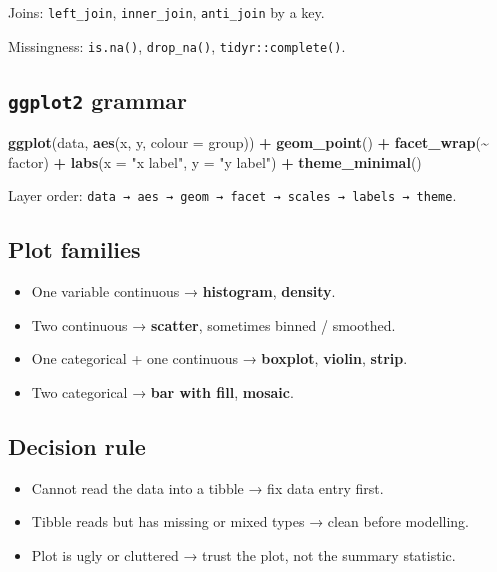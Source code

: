 \documentclass[
]{article}
\newenvironment{Shaded}{\begin{snugshade}}{\end{snugshade}}
\newcommand{\AttributeTok}[1]{\textcolor[rgb]{0.13,0.29,0.53}{#1}}
\newcommand{\FunctionTok}[1]{\textcolor[rgb]{0.13,0.29,0.53}{\textbf{#1}}}
\newcommand{\NormalTok}[1]{#1}
\newcommand{\SpecialCharTok}[1]{\textcolor[rgb]{0.81,0.36,0.00}{\textbf{#1}}}
\newcommand{\StringTok}[1]{\textcolor[rgb]{0.31,0.60,0.02}{#1}}
\providecommand{\tightlist}{%
  \setlength{\itemsep}{0pt}\setlength{\parskip}{0pt}}
\begin{document}
Joins: \texttt{left\_join}, \texttt{inner\_join}, \texttt{anti\_join} by
a key.

Missingness: \texttt{is.na()}, \texttt{drop\_na()},
\texttt{tidyr::complete()}.

\subsection{\texorpdfstring{\texttt{ggplot2}
grammar}{ggplot2 grammar}}\label{ggplot2-grammar}

\begin{Shaded}
\begin{Highlighting}[]
\FunctionTok{ggplot}\NormalTok{(data, }\FunctionTok{aes}\NormalTok{(x, y, }\AttributeTok{colour =}\NormalTok{ group)) }\SpecialCharTok{+}
  \FunctionTok{geom\_point}\NormalTok{() }\SpecialCharTok{+}
  \FunctionTok{facet\_wrap}\NormalTok{(}\SpecialCharTok{\textasciitilde{}}\NormalTok{ factor) }\SpecialCharTok{+}
  \FunctionTok{labs}\NormalTok{(}\AttributeTok{x =} \StringTok{"x label"}\NormalTok{, }\AttributeTok{y =} \StringTok{"y label"}\NormalTok{) }\SpecialCharTok{+}
  \FunctionTok{theme\_minimal}\NormalTok{()}
\end{Highlighting}
\end{Shaded}

Layer order:
\texttt{data\ →\ aes\ →\ geom\ →\ facet\ →\ scales\ →\ labels\ →\ theme}.

\subsection{Plot families}\label{plot-families}

\begin{itemize}
\tightlist
\item
  One variable continuous → \textbf{histogram}, \textbf{density}.
\item
  Two continuous → \textbf{scatter}, sometimes binned / smoothed.
\item
  One categorical + one continuous → \textbf{boxplot}, \textbf{violin},
  \textbf{strip}.
\item
  Two categorical → \textbf{bar with fill}, \textbf{mosaic}.
\end{itemize}

\subsection{Decision rule}\label{decision-rule}

\begin{itemize}
\tightlist
\item
  Cannot read the data into a tibble → fix data entry first.
\item
  Tibble reads but has missing or mixed types → clean before modelling.
\item
  Plot is ugly or cluttered → trust the plot, not the summary statistic.
\end{itemize}
\end{document}
